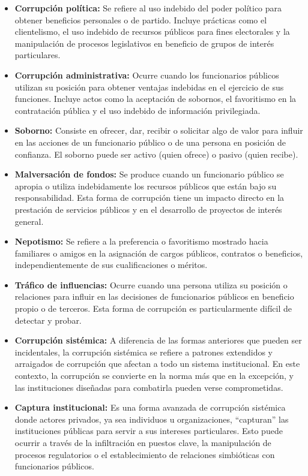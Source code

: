\documentclass[12pt,a4paper]{article}
\begin{document}
\begin{itemize}
    \item \textbf{Corrupción política:} Se refiere al uso indebido del poder político para obtener beneficios personales o de partido. Incluye prácticas como el clientelismo, el uso indebido de recursos públicos para fines electorales y la manipulación de procesos legislativos en beneficio de grupos de interés particulares.
    
    \item \textbf{Corrupción administrativa:} Ocurre cuando los funcionarios públicos utilizan su posición para obtener ventajas indebidas en el ejercicio de sus funciones. Incluye actos como la aceptación de sobornos, el favoritismo en la contratación pública y el uso indebido de información privilegiada.
    
    \item \textbf{Soborno:} Consiste en ofrecer, dar, recibir o solicitar algo de valor para influir en las acciones de un funcionario público o de una persona en posición de confianza. El soborno puede ser activo (quien ofrece) o pasivo (quien recibe).
    
    \item \textbf{Malversación de fondos:} Se produce cuando un funcionario público se apropia o utiliza indebidamente los recursos públicos que están bajo su responsabilidad. Esta forma de corrupción tiene un impacto directo en la prestación de servicios públicos y en el desarrollo de proyectos de interés general.
    
    \item \textbf{Nepotismo:} Se refiere a la preferencia o favoritismo mostrado hacia familiares o amigos en la asignación de cargos públicos, contratos o beneficios, independientemente de sus cualificaciones o méritos.
    
    \item \textbf{Tráfico de influencias:} Ocurre cuando una persona utiliza su posición o relaciones para influir en las decisiones de funcionarios públicos en beneficio propio o de terceros. Esta forma de corrupción es particularmente difícil de detectar y probar.
    
    \item \textbf{Corrupción sistémica:} A diferencia de las formas anteriores que pueden ser incidentales, la corrupción sistémica se refiere a patrones extendidos y arraigados de corrupción que afectan a todo un sistema institucional. En este contexto, la corrupción se convierte en la norma más que en la excepción, y las instituciones diseñadas para combatirla pueden verse comprometidas.
    
    \item \textbf{Captura institucional:} Es una forma avanzada de corrupción sistémica donde actores privados, ya sea individuos u organizaciones, ``capturan'' las instituciones públicas para servir a sus intereses particulares. Esto puede ocurrir a través de la infiltración en puestos clave, la manipulación de procesos regulatorios o el establecimiento de relaciones simbióticas con funcionarios públicos.
\end{itemize}
\end{document}
